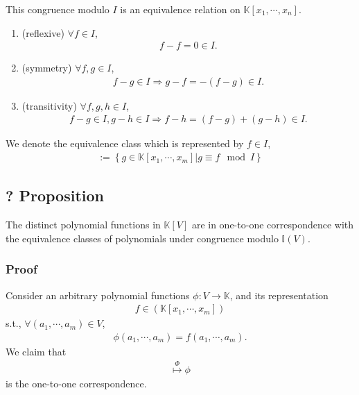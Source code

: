 \documentclass[11pt]{book}
\begin{document}
This congruence modulo $I$ is an equivalence relation on $\mathbb{K}[x_1, \cdots, x_n]$.
\begin{enumerate}
\item (reflexive) $\forall f \in I$,
\begin{eqnarray}
f - f = 0 \in I.
\end{eqnarray}

\item (symmetry) $\forall f,g \in I$,
\begin{eqnarray}
f - g \in I \Rightarrow g - f = -(f-g) \in I.
\end{eqnarray}

\item (transitivity) $\forall f,g,h \in I$,
\begin{eqnarray}
f-g \in I, g-h \in I \Rightarrow f-h = (f-g) + (g-h) \in I.
\end{eqnarray}

\end{enumerate}
We denote the equivalence class which is represented by $f \in I$,
\begin{eqnarray}
[f] := \left\{ \left. g \in \mathbb{K}[x_1, \cdots, x_m] \right| g \equiv f \mod I \right\}
\end{eqnarray}

\subsection{? Proposition}
\label{121Correspondence}
The distinct polynomial functions in $\mathbb{K}[V]$ are in one-to-one correspondence with the equivalence classes of polynomials under congruence modulo $\mathbb{I}(V)$.

\subsubsection{Proof}
Consider an arbitrary polynomial functions $\phi : V \to \mathbb{K}$, and its representation
\begin{eqnarray}
f \in \left( \mathbb{K}[x_1, \cdots, x_m] \right)
\end{eqnarray}
s.t., $\forall (a_1, \cdots, a_m) \in V$,
\begin{eqnarray}
\phi(a_1, \cdots, a_m) = f(a_1, \cdots, a_m).
\end{eqnarray}
We claim that
\begin{eqnarray}
[f] \stackrel{\Phi}{\mapsto} \phi
\end{eqnarray}
is the one-to-one correspondence.
\end{document}
